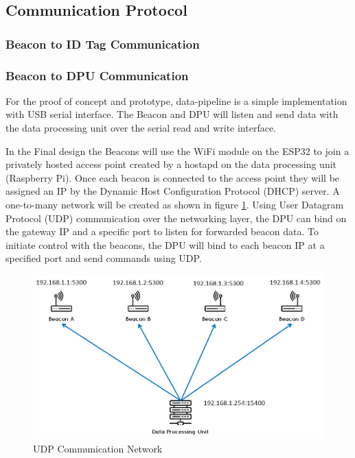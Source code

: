 \pagebreak
\subsection{Communication Protocol}
\subsubsection{Beacon to ID Tag Communication}



\pagebreak
\subsubsection{Beacon to DPU Communication}
\medskip
For the proof of concept and prototype, data-pipeline is a simple implementation with USB serial interface. The Beacon and DPU  will listen and send data with the data processing unit over the serial read and write interface. 

\bigskip
In the Final design the Beacons will use the WiFi module on the ESP32 to join a privately hosted access point created by a hostapd on the data processing unit (Raspberry Pi). Once each beacon is connected to the access point they will be assigned an IP by the Dynamic Host Configuration Protocol (DHCP) server. A one-to-many network will be created as shown in figure \ref{udp}. Using User Datagram Protocol (UDP) communication over the networking layer, the DPU can bind on the gateway IP and a specific port to listen for forwarded beacon data. To initiate control with the beacons, the DPU will bind to each beacon IP at a specified port and send commands using UDP.

\medskip
\begin{figure}[H]
\centering
    \includegraphics[scale=0.7]{./images/UDP.png}
    \caption{UDP Communication Network}
    \label{udp}
\end{figure}
\medskip



